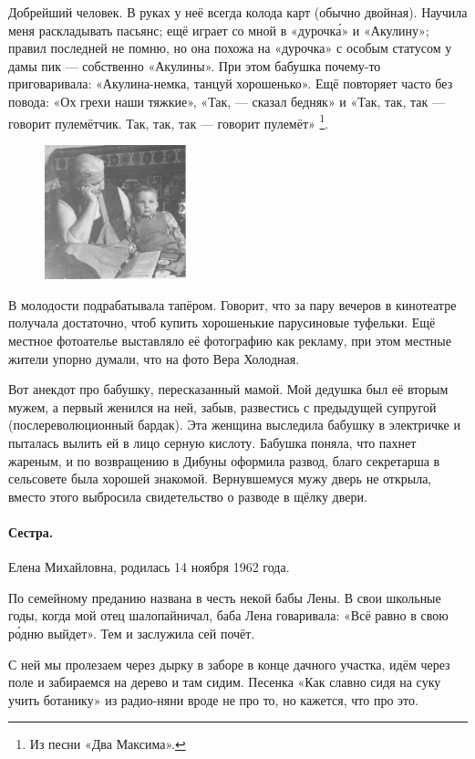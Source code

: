 \documentclass{book}
\begin{document}
Добрейший человек.
В руках у неё всегда колода карт (обычно двойная).
Научила меня раскладывать пасьянс;  ещё играет со мной в «дурочк\'{а}» и
«Акулину»;
правил последней не помню, но она похожа на «дурочка» с особым статусом у дамы пик --- собственно «Акулины».
При этом бабушка почему-то приговаривала: «Акулина-немка, танцуй хорошенько».
Ещё повторяет часто без повода: «Ох грехи наши тяжкие»,
«Так, --- сказал бедняк»
и «Так, так, так --- говорит пулемётчик. Так, так, так --- говорит пулемёт»%
\footnote{Из песни «Два Максима».}.

\begin{figure}
\vskip-4mm
\centering
\includegraphics[width=41mm,angle=0]{pics/baba-lyusya-tosha}
\end{figure}

В молодости подрабатывала тапёром.
Говорит, что за пару вечеров в кинотеатре получала достаточно, чтоб купить хорошенькие парусиновые туфельки.
Ещё местное фотоателье выставляло её фотографию как рекламу, при этом местные жители упорно думали, что на фото Вера Холодная.

Вот анекдот про бабушку, пересказанный мамой.
Мой дедушка был её вторым мужем, а первый женился на ней, забыв, развестись с предыдущей супругой (послереволюционный бардак).
Эта женщина выследила бабушку в электричке и пыталась вылить ей в лицо серную кислоту.
Бабушка поняла, что пахнет жареным, и по возвращению в Дибуны оформила развод, благо секретарша в сельсовете была хорошей знакомой.
Вернувшемуся мужу дверь не открыла, вместо этого выбросила свидетельство о разводе в щёлку двери.

\paragraph{Сестра.} Елена Михайловна, родилась 14 ноября 1962 года.

По семейному преданию названа в честь некой бабы Лены.
В свои школьные годы,
когда мой отец шалопайничал,
баба Лена говаривала: «Всё равно в свою р\'{о}дню выйдет».
Тем и заслужила сей почёт.

С ней мы пролезаем через дырку в заборе в конце дачного участка, идём через поле и забираемся на дерево и там сидим.
Песенка «Как славно сидя на суку учить ботанику» из радио-няни вроде не про то, но кажется, что про это.
\end{document}
